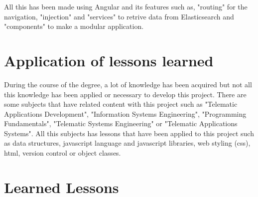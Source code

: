 \documentclass[a4paper, 12pt, english]{book}
\begin{document}
All this has been made using Angular and its features such as, "routing" for the navigation, "injection" and "services" to retrive data from Elasticsearch and "components" to make a modular application.




\section{Application of lessons learned}
\label{sec:application-of-lessons-learned}
During the course of the degree, a lot of knowledge has been acquired but not all this knowledge has been applied or necessary to develop this project. There are some subjects that have related content with this project such as "Telematic Applications Development", "Information Systems Engineering", "Programming Fundamentals", "Telematic Systems Engineering" or "Telematic Applications Systems". All this subjects has lessons that have been applied to this project such as data structures, javascript language and javascript libraries, web styling (css), html, version control or object classes.




\section{Learned Lessons}
\label{sec:learned-lessons}
\end{document}
